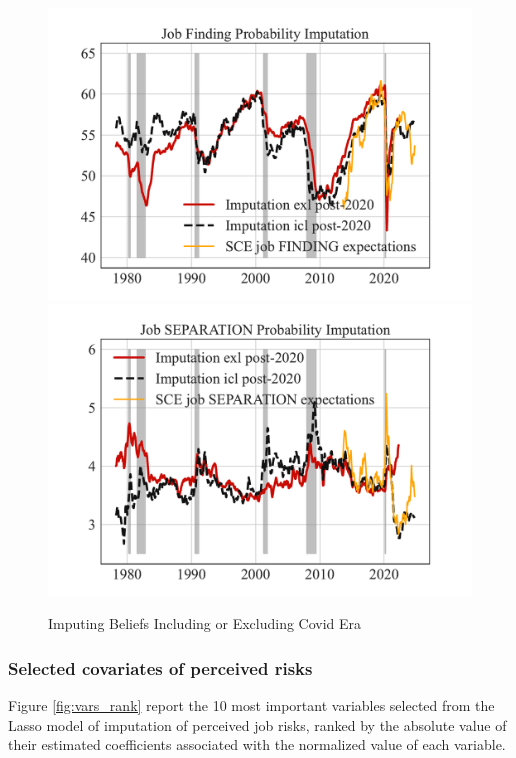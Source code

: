 \begin{figure}[pt]
    \centering
    \caption{Imputing Beliefs Including or Excluding Covid Era}\label{fig:imputed_JF_comparison_covid}
\includegraphics[width=0.7\linewidth]{Figures/imputed_JF_comparison_covid.pdf} 
\includegraphics[width=0.7\linewidth]{Figures/imputed_JS_comparison_covid.pdf} 
\end{figure}

\subsubsection{Selected covariates of perceived risks}
\label{appendix: covariates_perceived_risks}

Figure \ref{fig:vars_rank} report the 10 most important variables selected from the Lasso model of imputation of perceived job risks, ranked by the absolute value of their estimated coefficients associated with the normalized value of each variable.  

